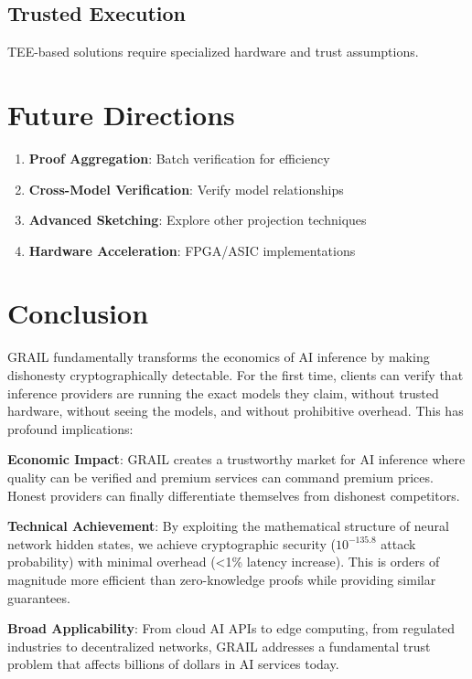 \documentclass[11pt,a4paper]{article}
\begin{document}
\subsection{Trusted Execution}
TEE-based solutions \cite{tee2022} require specialized hardware and trust assumptions.

\section{Future Directions}

\begin{enumerate}
    \item \textbf{Proof Aggregation}: Batch verification for efficiency
    \item \textbf{Cross-Model Verification}: Verify model relationships
    \item \textbf{Advanced Sketching}: Explore other projection techniques
    \item \textbf{Hardware Acceleration}: FPGA/ASIC implementations
\end{enumerate}

\section{Conclusion}

GRAIL fundamentally transforms the economics of AI inference by making dishonesty cryptographically detectable. For the first time, clients can verify that inference providers are running the exact models they claim, without trusted hardware, without seeing the models, and without prohibitive overhead. This has profound implications:

\textbf{Economic Impact}: GRAIL creates a trustworthy market for AI inference where quality can be verified and premium services can command premium prices. Honest providers can finally differentiate themselves from dishonest competitors.

\textbf{Technical Achievement}: By exploiting the mathematical structure of neural network hidden states, we achieve cryptographic security ($10^{-135.8}$ attack probability) with minimal overhead (<1\% latency increase). This is orders of magnitude more efficient than zero-knowledge proofs while providing similar guarantees.

\textbf{Broad Applicability}: From cloud AI APIs to edge computing, from regulated industries to decentralized networks, GRAIL addresses a fundamental trust problem that affects billions of dollars in AI services today.
\end{document}
